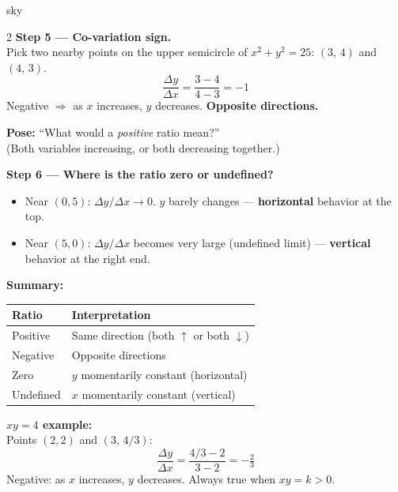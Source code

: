 \documentclass[10pt]{article}
\begin{document}
\begin{skillbox}{sky}
\begin{multicols}{2}
\textbf{Step 5 --- Co-variation sign.}\\
Pick two nearby points on the upper semicircle of $x^2+y^2=25$:
$(3,\,4)$ and $(4,\,3)$.
\[ \frac{\Delta y}{\Delta x} = \frac{3-4}{4-3} = -1 \]
Negative $\Rightarrow$ as $x$ increases, $y$ decreases. \textbf{Opposite directions.}

\textbf{Pose:} ``What would a \emph{positive} ratio mean?''\\
(Both variables increasing, or both decreasing together.)

\textbf{Step 6 --- Where is the ratio zero or undefined?}\\
\begin{itemize}[leftmargin=1em, itemsep=2pt]
    \item Near $(0,5)$: $\Delta y/\Delta x \to 0$.
          $y$ barely changes --- \textbf{horizontal} behavior at the top.
    \item Near $(5,0)$: $\Delta y/\Delta x$ becomes very large (undefined limit)
          --- \textbf{vertical} behavior at the right end.
\end{itemize}

\columnbreak

\textbf{Summary:}\\[2pt]
\renewcommand{\arraystretch}{1.4}
\begin{tabularx}{\columnwidth}{@{}X l@{}}
\textbf{Ratio} & \textbf{Interpretation} \\\hline
Positive & Same direction (both $\uparrow$ or both $\downarrow$) \\
Negative & Opposite directions \\
Zero & $y$ momentarily constant (horizontal) \\
Undefined & $x$ momentarily constant (vertical) \\
\end{tabularx}

\vspace{6pt}
\textbf{$xy = 4$ example:}\\
Points $(2,2)$ and $(3,\,4/3)$:
\[ \frac{\Delta y}{\Delta x} = \frac{4/3 - 2}{3-2} = -\tfrac{2}{3} \]
Negative: as $x$ increases, $y$ decreases. Always true when $xy = k > 0$.
\end{multicols}
\end{skillbox}
\end{document}
